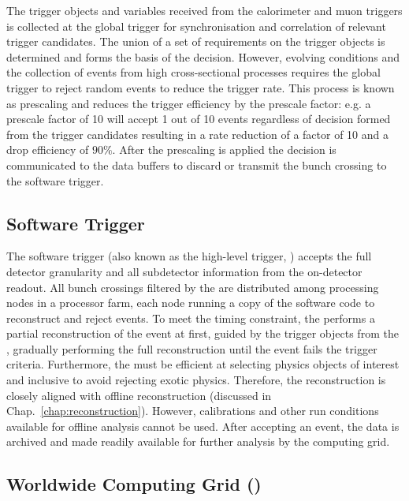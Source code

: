 The trigger objects and variables received from the calorimeter and muon triggers is collected at the global trigger for synchronisation and correlation of relevant trigger candidates. The union of a set of requirements on the trigger objects is determined and forms the basis of the \HWT decision.  However, evolving conditions and the collection of events from high cross-sectional processes requires the global trigger to reject random events to reduce the trigger rate. This process is known as prescaling and reduces the trigger efficiency by the prescale factor: e.g. a prescale factor of 10 will accept 1 out of 10 events regardless of decision formed from the trigger candidates resulting in a rate reduction of a factor of 10 and a drop efficiency of $90\%$. After the prescaling is applied the \HWT decision is communicated to the data buffers to discard or transmit the bunch crossing to the software trigger.


\subsection{Software Trigger}\label{sec:software-trigger}

The software trigger (also known as the high-level trigger, \SWT) accepts the full detector granularity and all subdetector information from the on-detector readout. All bunch crossings filtered by the \HWT are distributed among processing nodes in a processor farm, each node running a copy of the software code to reconstruct and reject events. To meet the timing constraint, the \SWT performs a partial reconstruction of the event at first, guided by the trigger objects from the \HWT, gradually performing the full reconstruction until the event fails the trigger criteria. Furthermore, the \SWT must be efficient at selecting physics objects of interest and inclusive to avoid rejecting exotic physics. Therefore, the \SWT reconstruction is closely aligned with offline reconstruction (discussed in Chap.~\ref{chap:reconstruction}). However, calibrations and other run conditions available for offline analysis cannot be used. After accepting an event, the data is archived and made readily available for further analysis by the computing grid.


\subsection{Worldwide \LHC Computing Grid (\WLCG)}

